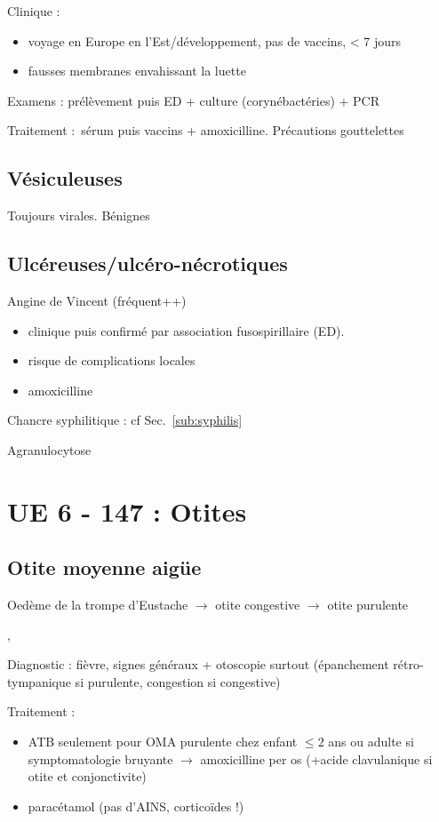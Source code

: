 \documentclass{article}
\begin{document}
Clinique : 
\begin{itemize}
  \item voyage en Europe en l'Est/développement, pas de vaccins, < 7 jours
  \item fausses membranes envahissant la luette
\end{itemize}

Examens : prélèvement puis ED + culture (corynébactéries) + PCR

Traitement : sérum puis vaccins + amoxicilline. Précautions gouttelettes

\subsection{Vésiculeuses}%
Toujours virales. Bénignes


\subsection{Ulcéreuses/ulcéro-nécrotiques}
Angine de Vincent (fréquent++) 
\begin{itemize}
  \item clinique puis confirmé par association fusospirillaire (ED).
  \item risque de complications locales
  \item amoxicilline
\end{itemize}

Chancre syphilitique : cf Sec.~\ref{sub:syphilis}

Agranulocytose

\section{UE 6 - 147 : Otites}%
\label{sec:otites}
\subsection{Otite moyenne aigüe}%
\label{sub:otite_moyenn_aigue}
Oedème de la trompe d'Eustache $\to$ otite congestive $\to$ otite purulente

, 

Diagnostic : fièvre, signes généraux + otoscopie surtout (épanchement
rétro-tympanique si purulente, congestion si congestive)

Traitement : 
\begin{itemize}
  \item ATB seulement pour OMA purulente chez enfant $\le 2$ ans ou adulte si
symptomatologie bruyante
$\rightarrow$ amoxicilline per os (+acide clavulanique si otite et conjonctivite)
\item paracétamol (pas d'AINS, corticoïdes !)
\end{itemize}
\end{document}
